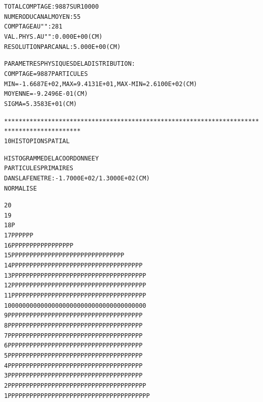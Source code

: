 \begin{alltt}
                TOTAL  COMPTAGE                 :    9887  SUR  10000
                NUMERO   DU  CANAL  MOYEN       :      55
                COMPTAGE  AU   "      "         :     281
                VAL. PHYS. AU  "      "         :  0.000E+00 (CM) 
                RESOLUTION  PAR  CANAL          :  5.000E+00 (CM) 

                PARAMETRES  PHYSIQUES  DE  LA  DISTRIBUTION :
                              COMPTAGE =   9887  PARTICULES
                              MIN = -1.6687E+02, MAX = 9.4131E+01, MAX-MIN = 2.6100E+02(CM) 
                              MOYENNE = -9.2496E-01 (CM) 
                              SIGMA =  5.3583E+01 (CM) 

*******************************************************************************************
     10  HISTO     PION      SPATIAL 

                              HISTOGRAMME  DE  LA  COORDONNEE  Y    
                              PARTICULES  PRIMAIRES                 
                              DANS  LA  FENETRE :  -1.7000E+02 /   1.3000E+02 (CM) 
                              NORMALISE     

   20                                                                                      
   19                                                                                      
   18                                                   P                                  
   17                                             P     PP        P  P      P              
   16                                             PP    PP PPP  P PP P P  PPPPP            
   15                                           P PPPPP PPPPPPPPPPPPPPPPPPPPPPP PP         
   14                                         PPPPPPPPP PPPPPPPPPPPPPPPPPPPPPPPPPPP        
   13                                         PPPPPPPPPPPPPPPPPPPPPPPPPPPPPPPPPPPPP        
   12                                         PPPPPPPPPPPPPPPPPPPPPPPPPPPPPPPPPPPPP        
   11                                         PPPPPPPPPPPPPPPPPPPPPPPPPPPPPPPPPPPPP        
   10                                         0000000000000000000000000000000000000        
    9                                         PPPPPPPPPPPPPPPPPPPPPPPPPPPPPPPPPPPPP        
    8                                         PPPPPPPPPPPPPPPPPPPPPPPPPPPPPPPPPPPPP        
    7                                         PPPPPPPPPPPPPPPPPPPPPPPPPPPPPPPPPPPPP        
    6                                         PPPPPPPPPPPPPPPPPPPPPPPPPPPPPPPPPPPPP        
    5                                         PPPPPPPPPPPPPPPPPPPPPPPPPPPPPPPPPPPPP        
    4                                         PPPPPPPPPPPPPPPPPPPPPPPPPPPPPPPPPPPPP        
    3                                         PPPPPPPPPPPPPPPPPPPPPPPPPPPPPPPPPPPPP        
    2                                        PPPPPPPPPPPPPPPPPPPPPPPPPPPPPPPPPPPPPP        
    1                                        PPPPPPPPPPPPPPPPPPPPPPPPPPPPPPPPPPPPPPP       


\end{alltt}
